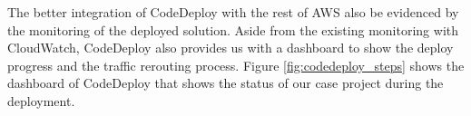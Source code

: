 \par
The better integration of CodeDeploy with the rest of AWS also be evidenced by the monitoring of the deployed solution. Aside from the existing monitoring with CloudWatch, CodeDeploy also provides us with a dashboard to show the deploy progress and the traffic rerouting process. Figure \ref{fig:codedeploy_steps} shows the dashboard of CodeDeploy that shows the status of our case project during the deployment.

